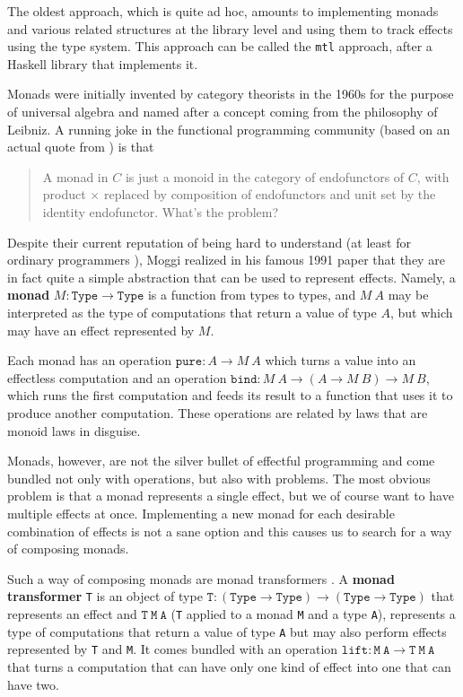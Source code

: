 \documentclass[declaration,inz,english,shortabstract]{iithesis}
\newcommand{\m}[1]{\texttt{#1}}
\newcommand{\Type}{\texttt{Type}}
\begin{document}
The oldest approach, which is quite ad hoc, amounts to implementing monads and various related structures at the library level and using them to track effects using the type system. This approach can be called the \m{mtl} approach, after a Haskell library that implements it.

Monads were initially invented by category theorists in the 1960s for the purpose of universal algebra and named after a concept coming from the philosophy of Leibniz. A running joke in the functional programming community (based on an actual quote from \cite{CWM}) is that

\begin{quote}
    A monad in $C$ is just a monoid in the category of endofunctors of $C$, with product $\times$ replaced by composition of endofunctors and unit set by the identity endofunctor. What's the problem?
\end{quote}

Despite their current reputation of being hard to understand (at least for ordinary programmers \cite{MonadTutorialFallacy}), Moggi realized in his famous 1991 paper \cite{Moggi} that they are in fact quite a simple abstraction that can be used to represent effects. Namely, a \textbf{monad} $M : \Type \to \Type$ is a function from types to types, and $M\ A$ may be interpreted as the type of computations that return a value of type $A$, but which may have an effect represented by $M$.

Each monad has an operation $\m{pure} : A \to M\ A$ which turns a value into an effectless computation and an operation $\m{bind} : M\ A \to (A \to M\ B) \to M\ B$, which runs the first computation and feeds its result to a function that uses it to produce another computation. These operations are related by laws that are monoid laws in disguise.

Monads, however, are not the silver bullet of effectful programming and come bundled not only with operations, but also with problems. The most obvious problem is that a monad represents a single effect, but we of course want to have multiple effects at once. Implementing a new monad for each desirable combination of effects is not a sane option and this causes us to search for a way of composing monads.

Such a way of composing monads are monad transformers \cite{mtl}. A \textbf{monad transformer} \m{T} is an object of type $\m{T} : (\Type \to \Type) \to (\Type \to \Type)$ that represents an effect and $\m{T}\ \m{M}\ \m{A}$ (\m{T} applied to a monad \m{M} and a type \m{A}), represents a type of computations that return a value of type \m{A} but may also perform effects represented by \m{T} and \m{M}. It comes bundled with an operation $\m{lift} : \m{M}\ \m{A} \to \m{T}\ \m{M}\ \m{A}$ that turns a computation that can have only one kind of effect into one that can have two.
\end{document}
